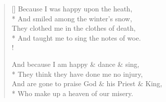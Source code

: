 \documentclass[MAIN]{subfiles}
\begin{document}
\settowidth{\versewidth}{And are gone to praise God \& his Priest \& King,}
\begin{verse}[\versewidth]
Because I was happy upon the heath,\\*
\vin And smiled among the winter's snow,\\
They clothed me in the clothes of death,\\*
\vin And taught me to sing the notes of woe.\\!

And because I am happy \& dance \& sing,\\*
\vin They think they have done me no injury,\\
And are gone to praise God \& his Priest \& King,\\*
\vin Who make up a heaven of our misery.
\end{verse}
\end{document}
